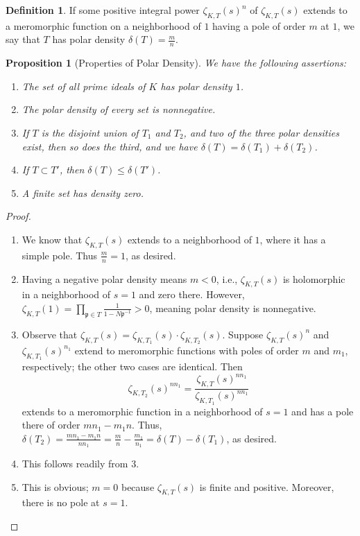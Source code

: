 \documentclass{article}
\theoremstyle{plain}
\newtheorem{prop}[thm]{Proposition}
\theoremstyle{definition}
\newtheorem{defn}[thm]{Definition}
\theoremstyle{remark}
\numberwithin{equation}{section}
\numberwithin{thm}{section}
\begin{document}
\begin{defn}
If some positive integral power $\zeta_{K, T}(s)^{n}$ of $\zeta_{K, T}(s)$ extends to a meromorphic function on a neighborhood of $1$ having a pole of order $m$ at $1$, we say that $T$ has polar density $\delta(T) = \frac{m}{n}$. 
\end{defn}

\begin{prop}[Properties of Polar Density]

We have the following assertions:

\begin{enumerate}
    \item The set of all prime ideals of $K$ has polar density $1$.
    \item The polar density of every set is nonnegative.
    \item If $T$ is the disjoint union of $T_1$ and $T_2$, and two of the three polar densities exist, then so does the third, and we have $\delta(T) = \delta(T_1) + \delta(T_2)$.
    \item If $T \subset T'$, then $\delta(T) \leq \delta(T')$.
    \item A finite set has density zero. 
\end{enumerate}

\end{prop}

\begin{proof}

$ $\\ \vspace{-0.4cm}

\begin{enumerate}

    \item We know that $\zeta_{K, T}(s)$ extends to a neighborhood of $1$, where it has a simple pole. Thus $\frac{m}{n} = 1$, as desired.
    \item Having a negative polar density means $m < 0$, i.e., $\zeta_{K, T}(s)$ is holomorphic in a neighborhood of $s = 1$ and zero there. However, $\zeta_{K, T}(1) = \prod_{\mathfrak{p} \in T} \frac{1}{1 - N\mathfrak{p}^{-1}} > 0$, meaning polar density is nonnegative.
    \item Observe that $\zeta_{K, T}(s) = \zeta_{K, T_1}(s) \cdot \zeta_{K, T_2}(s)$. Suppose $\zeta_{K, T}(s)^{n}$ and $\zeta_{K, T_1}(s)^{n_1}$ extend to meromorphic functions with poles of order $m$ and $m_1$, respectively; the other two cases are identical. Then $$\zeta_{K, T_2}(s)^{nn_1} = \frac{\zeta_{K, T}(s)^{nn_1}}{\zeta_{K, T_1}(s)^{nn_1}}$$ extends to a meromorphic function in a neighborhood of $s = 1$ and has a pole there of order $mn_1 - m_1n$. Thus, $\delta(T_2) = \frac{mn_1 - m_1n}{nn_1} = \frac{m}{n} - \frac{m_1}{n_1} = \delta(T) - \delta(T_1)$, as desired.
    \item This follows readily from 3. 
    \item This is obvious; $m = 0$ because $\zeta_{K, T}(s)$ is finite and positive. Moreover, there is no pole at $s = 1$.
\end{enumerate}

\end{proof}
\end{document}
